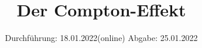 

\subject{Versuch 603}
\title{Der Compton-Effekt}
\date{%
  Durchführung: 18.01.2022(online)
  \hspace{3em}
  Abgabe: 25.01.2022
}



\maketitle
\thispagestyle{empty}
\tableofcontents
\newpage






\nocite{matplotlib,numpy,scipy,uncertainties}
\printbibliography{}

